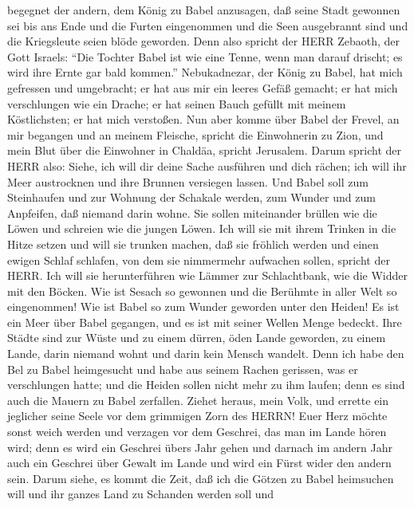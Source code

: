 begegnet der andern, dem König zu Babel anzusagen, daß seine Stadt
gewonnen sei bis ans Ende  und die Furten eingenommen und
die Seen ausgebrannt sind und die Kriegsleute seien blöde geworden.
 Denn also spricht der HERR Zebaoth, der Gott Israels:
``Die Tochter Babel ist wie eine Tenne, wenn man darauf drischt; es wird
ihre Ernte gar bald kommen.''  Nebukadnezar, der König zu
Babel, hat mich gefressen und umgebracht; er hat aus mir ein leeres
Gefäß gemacht; er hat mich verschlungen wie ein Drache; er hat seinen
Bauch gefüllt mit meinem Köstlichsten; er hat mich verstoßen.
 Nun aber komme über Babel der Frevel, an mir begangen und
an meinem Fleische, spricht die Einwohnerin zu Zion, und mein Blut über
die Einwohner in Chaldäa, spricht Jerusalem.  Darum spricht
der HERR also: Siehe, ich will dir deine Sache ausführen und dich
rächen; ich will ihr Meer austrocknen und ihre Brunnen versiegen lassen.
 Und Babel soll zum Steinhaufen und zur Wohnung der
Schakale werden, zum Wunder und zum Anpfeifen, daß niemand darin wohne.
 Sie sollen miteinander brüllen wie die Löwen und schreien
wie die jungen Löwen.  Ich will sie mit ihrem Trinken in
die Hitze setzen und will sie trunken machen, daß sie fröhlich werden
und einen ewigen Schlaf schlafen, von dem sie nimmermehr aufwachen
sollen, spricht der HERR.  Ich will sie herunterführen wie
Lämmer zur Schlachtbank, wie die Widder mit den Böcken. 
Wie ist Sesach so gewonnen und die Berühmte in aller Welt so
eingenommen! Wie ist Babel so zum Wunder geworden unter den Heiden!
 Es ist ein Meer über Babel gegangen, und es ist mit seiner
Wellen Menge bedeckt.  Ihre Städte sind zur Wüste und zu
einem dürren, öden Lande geworden, zu einem Lande, darin niemand wohnt
und darin kein Mensch wandelt.  Denn ich habe den Bel zu
Babel heimgesucht und habe aus seinem Rachen gerissen, was er
verschlungen hatte; und die Heiden sollen nicht mehr zu ihm laufen; denn
es sind auch die Mauern zu Babel zerfallen.  Ziehet heraus,
mein Volk, und errette ein jeglicher seine Seele vor dem grimmigen Zorn
des HERRN!  Euer Herz möchte sonst weich werden und
verzagen vor dem Geschrei, das man im Lande hören wird; denn es wird ein
Geschrei übers Jahr gehen und darnach im andern Jahr auch ein Geschrei
über Gewalt im Lande und wird ein Fürst wider den andern sein.
 Darum siehe, es kommt die Zeit, daß ich die Götzen zu
Babel heimsuchen will und ihr ganzes Land zu Schanden werden soll und
